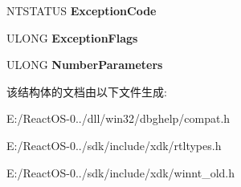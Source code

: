 \begin{DoxyCompactItemize}
\item 
\mbox{\label{struct___e_x_c_e_p_t_i_o_n___r_e_c_o_r_d_a79df6b0cfbbb8db8f8f2438954de31f2}} 
N\+T\+S\+T\+A\+T\+US {\bfseries Exception\+Code}
\item 
\mbox{\label{struct___e_x_c_e_p_t_i_o_n___r_e_c_o_r_d_ad4b43686cb8419ad9758b3fccb0fae5d}} 
U\+L\+O\+NG {\bfseries Exception\+Flags}
\item 
\mbox{\label{struct___e_x_c_e_p_t_i_o_n___r_e_c_o_r_d_a16df108159c54dbd4e86274e5793361d}} 
U\+L\+O\+NG {\bfseries Number\+Parameters}
\end{DoxyCompactItemize}


该结构体的文档由以下文件生成\+:\begin{DoxyCompactItemize}
\item 
E\+:/\+React\+O\+S-\/0../dll/win32/dbghelp/compat.\+h\item 
E\+:/\+React\+O\+S-\/0../sdk/include/xdk/rtltypes.\+h\item 
E\+:/\+React\+O\+S-\/0../sdk/include/xdk/winnt\+\_\+old.\+h\end{DoxyCompactItemize}
